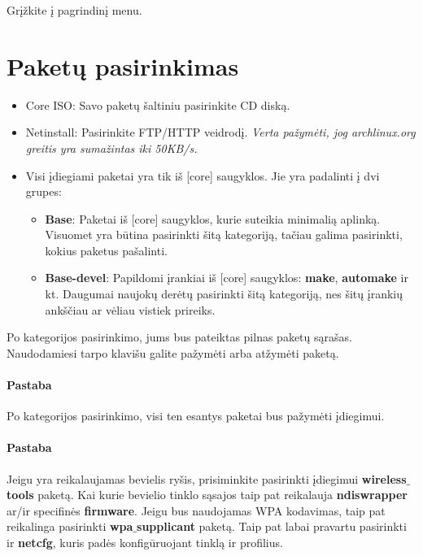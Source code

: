 Grįžkite į pagrindinį menu.

\section{Paketų pasirinkimas}

\begin{itemize}
  \item Core ISO: Savo paketų šaltiniu pasirinkite CD diską.
  \item Netinstall: Pasirinkite FTP/HTTP veidrodį. \textsl{Verta
    pažymėti, jog archlinux.org greitis yra sumažintas iki 50KB/s.}
  \item Visi įdiegiami paketai yra tik iš [core] saugyklos. Jie yra
    padalinti į dvi grupes:
    \begin{itemize}
      \item \textbf{Base}: Paketai iš [core] saugyklos, kurie suteikia
        minimalią aplinką. Visuomet yra būtina pasirinkti šitą
        kategoriją, tačiau galima pasirinkti, kokius paketus
        pašalinti.
      \item \textbf{Base-devel}: Papildomi įrankiai iš [core]
        saugyklos: \textbf{make}, \textbf{automake} ir kt. Daugumai
        naujokų derėtų pasirinkti šitą kategoriją, nes šitų įrankių
        ankščiau ar vėliau vistiek prireiks.
    \end{itemize} 
\end{itemize}

Po kategorijos pasirinkimo, jums bus pateiktas pilnas paketų
sąrašas. Naudodamiesi tarpo klavišu galite pažymėti arba atžymėti
paketą.

\paragraph{Pastaba} Po kategorijos pasirinkimo, visi ten esantys
paketai bus pažymėti įdiegimui.

\paragraph{Pastaba} Jeigu yra reikalaujamas bevielis ryšis,
prisiminkite pasirinkti įdiegimui \textbf{wireless$\_$tools}
paketą. Kai kurie bevielio tinklo sąsajos taip pat reikalauja
\textbf{ndiswrapper} ar/ir specifinės \textbf{firmware}. Jeigu bus
naudojamas WPA kodavimas, taip pat reikalinga pasirinkti
\textbf{wpa$\_$supplicant} paketą. Taip pat labai pravartu pasirinkti
ir \textbf{netcfg}, kuris padės konfigūruojant tinklą ir profilius.


